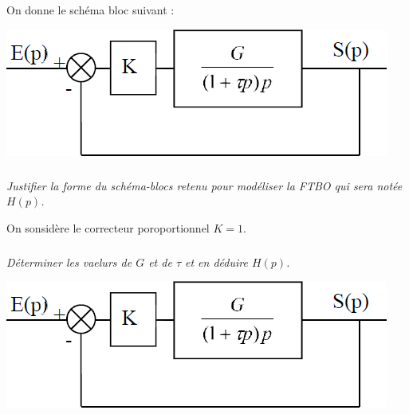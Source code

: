 \documentclass[10pt,fleqn]{article} %
\begin{document}
\begin{multicols}{2}
On donne le schéma bloc suivant :

\begin{center}
\includegraphics[width=\linewidth]{images/fig_02}
\end{center}

\subparagraph*{}\textit{Justifier la forme du schéma-blocs retenu pour modéliser la FTBO qui sera notée $H(p)$.}

On sonsidère le correcteur poroportionnel $K=1$. 
\subparagraph*{}\textit{Déterminer les vaelurs de $G$ et de $\tau$ et en déduire $H(p)$.}
\end{multicols}

\begin{center}
\includegraphics[width=\linewidth]{images/fig_02}
\end{center}
\end{document}
